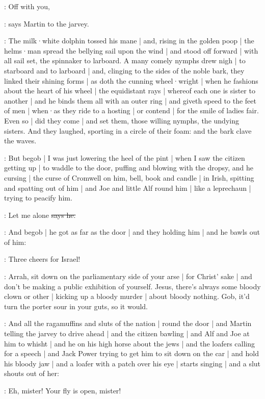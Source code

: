 \cunningham:
Off with you,

\Nq:
says Martin to the jarvey.

:
The milk·white dolphin tossed his mane |
and,
rising in the golden poop |
the helms·man spread the bellying sail upon the wind |
and stood off forward |
with all sail set,
the spinnaker to larboard.
A many comely nymphs drew nigh |
to starboard and to larboard |
and,
clinging to the sides of the noble bark,
they linked their shining forms |
as doth the cunning wheel·wright |
when he fashions about the heart of his wheel |
the equidistant rays |
whereof each one is sister to another |
and he binds them all with an outer ring |
and giveth speed to the feet of men |
when·as they ride to a hosting |
or contend |
for the smile of ladies fair.
Even so |
did they come |
and set them,
those willing nymphs,
the undying sisters.
And they laughed,
sporting in a circle of their foam:
and the bark clave the waves.

\Nq:
But begob |
I was just lowering the heel of the pint |
when I saw the citizen getting up |
to waddle to the door,
puffing and blowing with the dropsy,
and he cursing |
the curse of Cromwell on him,
bell, book and candle |
in Irish,
spitting and spatting out of him |
and Joe and little Alf round him |
like a leprechaun |
trying to peacify him.

\citizen:
Let me alone
\sout{says he.}

\Nq:
And begob |
he got as far as the door |
and they holding him |
and he bawls out of him:%

\citizen:
Three cheers for Israel!

\Nq:
Arrah,
sit down on the parliamentary side of your arse |
for Christ' sake |
and don't be making a public exhibition of yourself.
Jesus,
there's always some bloody clown or other |
kicking up a bloody murder |
about bloody nothing.
Gob,
it'd turn the porter sour in your guts,
so it would.

\Nq:
And all the ragamuffins and sluts of the nation |
round the door |
and Martin telling the jarvey to drive ahead |
and the citizen bawling |
and Alf and Joe at him to whisht |
and he on his high horse about the jews |
and the loafers calling for a speech |
and Jack Power trying to get him to sit down on the car |
and hold his bloody jaw
 |
and a loafer with a patch over his eye |
starts singing  |
and a slut shouts out of her:

\ragamuffin:
Eh,
mister!
Your fly is open,
mister!

